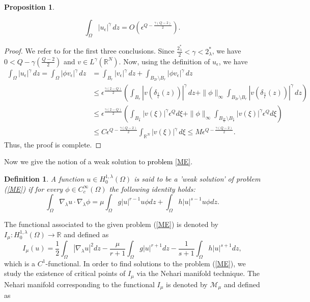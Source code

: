 \documentclass[12pt, notitlepage]{article}
\def\R{\mathbb{R}}
\newtheorem{prop}[theorem]{Proposition}
\newtheorem{defn}{Definition}[section]
\begin{document}
{\begin{prop}
\begin{enumerate}
       $$\int_\Omega |u_\epsilon|^\gamma\, dz=O(\epsilon^{Q-\frac{\gamma(Q-2)}{2}}).$$
    \end{enumerate}
\end{prop}
\begin{proof}
     We refer to \cite[ Proposition 4.2 ]{PL} for the first three conclusions. Since $\frac{2^*_\lambda}{2}<\gamma<2^*_\lambda$, we have $0<Q-\gamma\left(\frac{Q-2}{2}\right )$ and $v\in L^\gamma(\R^N).$ Now, using the definition of $u_\epsilon$, we have
\begin{align*}
\int_\Omega|u_\epsilon|^\gamma\, dz=\int_\Omega|\phi v_\epsilon|^\gamma\, dz&=\int_{B_r}|v_\epsilon|^\gamma\, dz+\int_{B_{2r}\setminus{B_r}}|\phi v_\epsilon|^\gamma\, dz\nonumber\\
&\leq \epsilon^\frac{\gamma(2-Q)}{2}\left (\int_{B_r}|v(\delta_\frac{1}{\epsilon} (z))|^\gamma\,  dz+\|\phi\|_\infty\int_{B_{2r}\setminus{B_r}} |v(\delta_\frac{1}{\epsilon}(z))|^\gamma\, dz\right )\nonumber\\
&\leq \epsilon^\frac{\gamma(2-Q)}{2}\left (\int_{B_\frac{r}{\epsilon}}|v(\xi)|^\gamma \epsilon^Q d\xi+ \|\phi\|_\infty\int_{B_\frac{2r}{\epsilon}\setminus{B_\frac{r}{\epsilon}}} |v(\xi)|^\gamma\epsilon^Q d\xi\right )\nonumber\\
&\leq C\epsilon^{Q-\frac{\gamma(Q-2)}{2}}\int_{\R^N}|v(\xi)|^\gamma\, d\xi\leq M\epsilon^{Q-\frac{\gamma(Q-2)}{2}}.
\end{align*}
Thus, the proof is complete.
\end{proof}
Now we give the notion of a weak solution to \textcolor{black}{problem \eqref{ME}}.
\begin{defn}\label{def1}
    A function $u\in H^{1,\lambda}_0(\Omega)$ is said to be a 'weak solution' of  problem (\ref{ME}) if for every $\phi\in C_c^\infty(\Omega)$ the following identity holds: 
    $$\int_\Omega \nabla_\lambda u\cdot \nabla_\lambda \phi=\mu\int_\Omega g|u|^{r-1}u\phi dz + \int_\Omega h|u|^{s-1}u\phi dz.$$
\end{defn}
The  functional associated to the given problem (\ref{ME}) is denoted by $I_\mu: H^{1,\lambda}_0(\Omega)\to \R$ and defined as 
 $$I_\mu(u)=\frac{1}{2}\int_\Omega |\nabla_\lambda u|^2 dz-\frac{\mu}{r+1}\int_\Omega g|u|^{r+1} dz-\frac{1}{s+1}\int_\Omega h|u|^{s+1} dz,$$
which is a $C^1$-functional. In order to find solutions to the problem (\ref{ME}), we study the existence of critical points of $I_\mu$ via the Nehari manifold technique. The Nehari manifold corresponding to the functional $I_\mu$ is denoted by $\mathcal{M}_\mu$ and defined as
}
\end{document}
